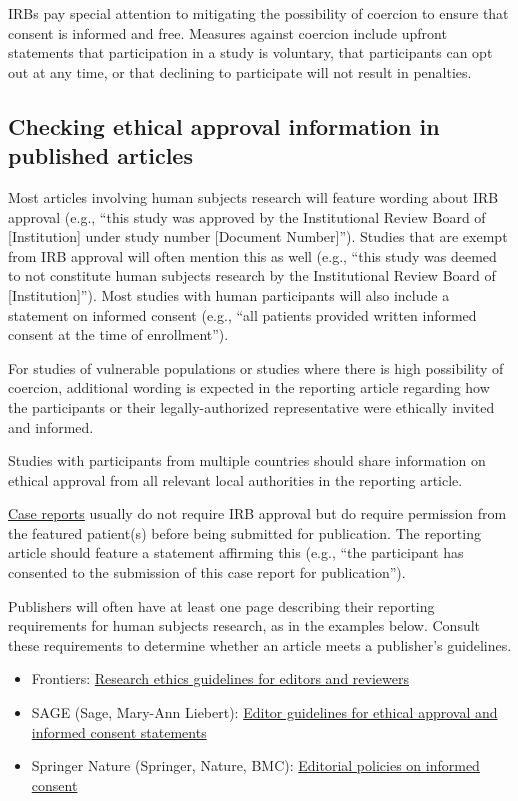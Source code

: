 \documentclass[letterpaper, 12pt]{article}
\begin{document}
IRBs pay special attention to mitigating the possibility of coercion to ensure that consent is informed and free. Measures against coercion include upfront statements that participation in a study is voluntary, that participants can opt out at any time, or that declining to participate will not result in penalties.

\subsection*{Checking ethical approval information in published articles}

Most articles involving human subjects research will feature wording about IRB approval (e.g., ``this study was approved by the Institutional Review Board of [Institution] under study number [Document Number]''). Studies that are exempt from IRB approval will often mention this as well (e.g., ``this study was deemed to not constitute human subjects research by the Institutional Review Board of [Institution]''). Most studies with human participants will also include a statement on informed consent (e.g., ``all patients provided written informed consent at the time of enrollment''). 

For studies of vulnerable populations or studies where there is high possibility of coercion, additional wording is expected in the reporting article regarding how the participants or their legally-authorized representative were ethically invited and informed.

Studies with participants from multiple countries should share information on ethical approval from all relevant local authorities in the reporting article.

\href{https://en.wikipedia.org/wiki/Case_report}{Case reports} usually do not require IRB approval but do require permission from the featured patient(s) before being submitted for publication. The reporting article should feature a statement affirming this (e.g., ``the participant has consented to the submission of this case report for publication'').

Publishers will often have at least one page describing their reporting requirements for human subjects research, as in the examples below. Consult these requirements to determine whether an article meets a publisher's guidelines.

\begin{itemize}
    \setlength\itemsep{-0.5em}
    \item Frontiers: \href{https://www.frontiersin.org/files/pdf/Research%20ethics_guidelines%20for%20editors%20and%20reviewers.pdf}{Research ethics guidelines for editors and reviewers}
    \item SAGE (Sage, Mary-Ann Liebert): \href{https://uk.sagepub.com/sites/default/files/editor_guidelines.pdf}{Editor guidelines for ethical approval and informed consent statements}
    \item Springer Nature (Springer, Nature, BMC): \href{https://www.springer.com/gp/editorial-policies/informed-consent?srsltid=AfmBOoryhgl-fRz6G7UtywN7SY2D62DcbOkNGsW8LHI4PtwA75TfNNFD}{Editorial policies on informed consent}
\end{itemize}
\end{document}
